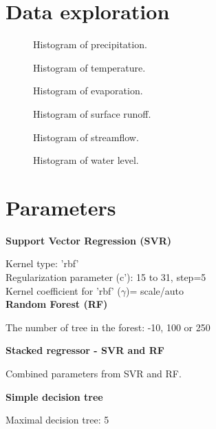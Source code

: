 \section{Data exploration}

  \begin{figure}[H]
  \centering
  
  \caption{Histogram of precipitation.}
  \end{figure}
  
    \begin{figure}[H]
  \centering
  
  \caption{Histogram of temperature.}
  \end{figure}
  
    \begin{figure}[H]
  \centering
  
  \caption{Histogram of evaporation.}
  \end{figure}
  
    \begin{figure}[H]
  \centering
  
  \caption{Histogram of surface runoff.}
  \end{figure}
  
      \begin{figure}[H]
  \centering
  
  \caption{Histogram of streamflow.}
  \end{figure}
  
      \begin{figure}[H]
  \centering
  
  \caption{Histogram of water level.}
  \end{figure}

\section{Parameters}

\textbf{Support Vector Regression (SVR)}

Kernel type: 'rbf' \\
Regularization parameter (c'): 15 to 31, step=5\\
Kernel coefficient for 'rbf' ($\gamma$)= scale/auto\\

\textbf{Random Forest (RF)}

The number of tree in the forest: -10, 100 or 250

\textbf{Stacked regressor - SVR and RF}

Combined parameters from SVR and RF.

\textbf{Simple decision tree}

Maximal decision tree: 5






